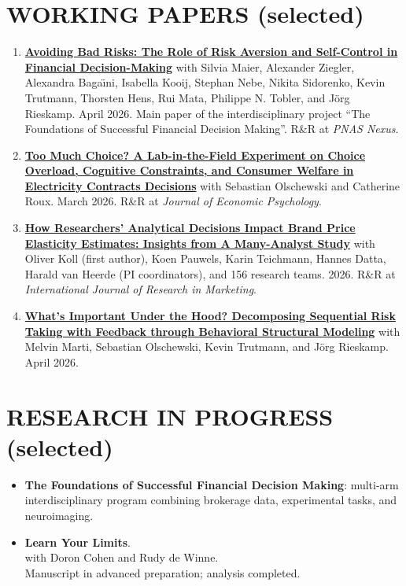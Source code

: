 \documentclass[10pt]{article}
\begin{document}
\section*{WORKING PAPERS (selected)}
\begin{enumerate}
\item \href{https://www.dropbox.com/scl/fi/77kv2cwhnvwh9qrmrvy9k/Heinke_etal_2026_Avoiding-bad-risks.pdf?rlkey=ct9jgewhh0bgipysode8ql54x&dl=0}{\textbf{Avoiding Bad Risks: The Role of Risk Aversion and Self-Control in Financial Decision-Making}} with
Silvia Maier, Alexander Ziegler, Alexandra Baga\"{\i}ni, Isabella Kooij, Stephan Nebe, Nikita Sidorenko, Kevin
Trutmann, Thorsten Hens, Rui Mata, Philippe N. Tobler, and J\"{o}rg Rieskamp. April 2026. Main paper of
the interdisciplinary project ``The Foundations of Successful Financial Decision Making''. R\&R
at \textit{PNAS Nexus}.

\item \href{https://www.dropbox.com/scl/fi/p3fi1nj35wwdsr722hg4l/Energy_Mix_Choice_under_Cognitive_Constraints_main.pdf?rlkey=z2r6zv3t0s2ri14t82d7rqi68&dl=0}{\textbf{Too Much Choice? A Lab-in-the-Field Experiment on Choice Overload, Cognitive Constraints, and Consumer Welfare in Electricity Contracts Decisions}} with Sebastian Olschewski
and Catherine Roux. March 2026. R\&R at \textit{Journal of Economic Psychology}.

\item \href{https://www.researchgate.net/publication/408399865_How_Researchers'_Analytical_Decisions_Impact_Brand_Price_Elasticity_Estimates_Insights_from_A_Many-Analyst_Study}{\textbf{How Researchers' Analytical Decisions Impact Brand Price Elasticity Estimates: Insights from A Many-Analyst Study}}
with Oliver Koll (first author), Koen Pauwels, Karin Teichmann, Hannes Datta, Harald van Heerde (PI coordinators),
and 156 research teams. 2026. R\&R at \textit{International Journal of Research in Marketing}.

\item \href{https://papers.ssrn.com/sol3/papers.cfm?abstract_id=7168338}{\textbf{What's Important Under the Hood? Decomposing Sequential Risk Taking with Feedback through
Behavioral Structural Modeling}} with Melvin Marti, Sebastian Olschewski, Kevin Trutmann, and J\"{o}rg Rieskamp. April 2026.
\end{enumerate}

\section*{RESEARCH IN PROGRESS (selected)}
\begin{itemize}
\item \textbf{The Foundations of Successful Financial Decision Making}: multi-arm interdisciplinary program
combining brokerage data, experimental tasks, and neuroimaging.

\item \textbf{Learn Your Limits}.\\
with Doron Cohen and Rudy de Winne.\\
Manuscript in advanced preparation; analysis completed.
\end{itemize}
\end{document}
